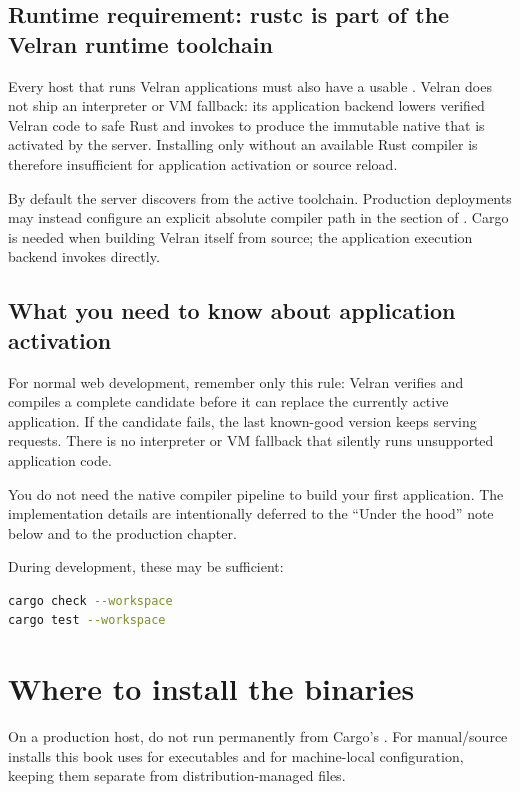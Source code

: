 \subsection*{Runtime requirement: rustc is part of the Velran runtime toolchain}

Every host that runs Velran applications must also have a usable . Velran does not ship an interpreter or VM fallback: its application backend lowers verified Velran code to safe Rust and invokes  to produce the immutable native  that is activated by the server. Installing only  without an available Rust compiler is therefore insufficient for application activation or source reload.

By default the server discovers  from the active toolchain. Production deployments may instead configure an explicit absolute compiler path in the \code{[native]} section of . Cargo is needed when building Velran itself from source; the application execution backend invokes  directly.

\subsection*{What you need to know about application activation}

For normal web development, remember only this rule: Velran verifies and compiles a complete candidate before it can replace the currently active application. If the candidate fails, the last known-good version keeps serving requests. There is no interpreter or VM fallback that silently runs unsupported application code.

You do not need the native compiler pipeline to build your first application. The implementation details are intentionally deferred to the ``Under the hood'' note below and to the production chapter.

During development, these may be sufficient:

\begin{lstlisting}[language=bash]
cargo check --workspace
cargo test --workspace
\end{lstlisting}

\section{Where to install the binaries}

On a production host, do not run permanently from Cargo's . For manual/source installs this book uses  for executables and  for machine-local configuration, keeping them separate from distribution-managed files.

